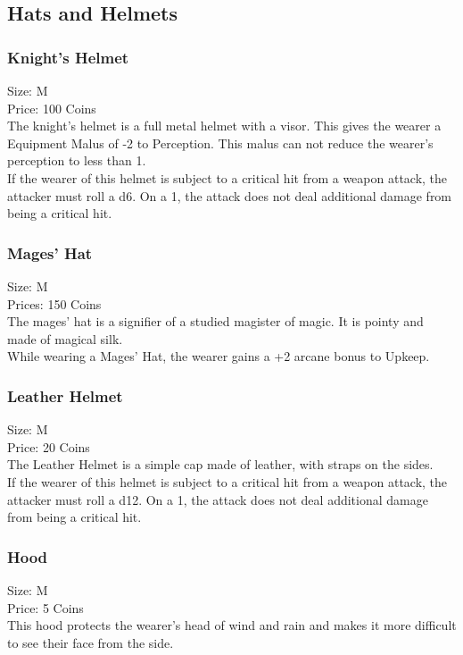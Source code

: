 \subsection{Hats and Helmets}\label{subsec:helmets}

\subsubsection{Knight's Helmet}\label{item:knightHelment}
Size: M\\
Price: 100 Coins\\
The knight's helmet is a full metal helmet with a visor.
This gives the wearer a Equipment Malus of -2 to Perception.
This malus can not reduce the wearer's perception to less than 1.\\
If the wearer of this helmet is subject to a critical hit from a weapon attack, the attacker must roll a d6.
On a 1, the attack does not deal additional damage from being a critical hit.\\

\subsubsection{Mages' Hat}\label{item:mageHat}
Size: M\\
Prices: 150 Coins\\
The mages' hat is a signifier of a studied magister of magic.
It is pointy and made of magical silk.\\
While wearing a Mages' Hat, the wearer gains a +2 arcane bonus to Upkeep.\\

\subsubsection{Leather Helmet}\label{item:leatherHelmet}
Size: M\\
Price: 20 Coins\\
The Leather Helmet is a simple cap made of leather, with straps on the sides.\\
If the wearer of this helmet is subject to a critical hit from a weapon attack, the attacker must roll a d12.
On a 1, the attack does not deal additional damage from being a critical hit.\\

\subsubsection{Hood}\label{item:hood}
Size: M\\
Price: 5 Coins\\
This hood protects the wearer's head of wind and rain and makes it more difficult to see their face from the side.\\

